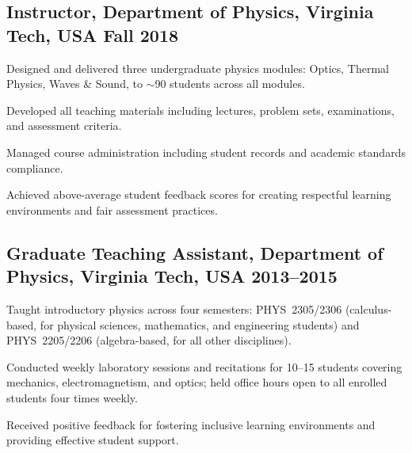 
\subsection{Instructor, Department of Physics, Virginia Tech, USA \hfill Fall 2018}
\begin{zitemize}
    \item Designed and delivered three undergraduate physics modules: Optics, Thermal Physics, Waves \& Sound, to $\sim$90 students across all modules.
    \item Developed all teaching materials including lectures, problem sets, examinations, and assessment criteria.
    \item Managed course administration including student records and academic standards compliance.
    \item Achieved above-average student feedback scores for creating respectful learning environments and fair assessment practices.
\end{zitemize}


\newpage
\subsection{Graduate Teaching Assistant, Department of Physics, Virginia Tech, USA \hfill 2013--2015}
\begin{zitemize}
    \item Taught introductory physics across four semesters: PHYS~2305/2306 (calculus-based, for physical sciences, mathematics, and engineering students) and PHYS~2205/2206 (algebra-based, for all other disciplines).
    \item Conducted weekly laboratory sessions and recitations for 10--15 students covering mechanics, electromagnetism, and optics; held office hours open to all enrolled students four times weekly.
    \item Received positive feedback for fostering inclusive learning environments and providing effective student support.
\end{zitemize}
